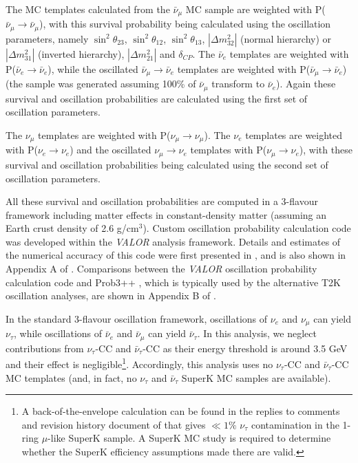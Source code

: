 The MC templates calculated from the $\bar{\nu}_{\mu}$ MC sample are weighted 
with P($\bar{\nu}_{\mu} \rightarrow \bar{\nu}_{\mu}$), with this survival probability being calculated using the 
oscillation parameters, namely $\sin^{2} \theta_{23}$, $\sin^{2} \theta_{12}$, $\sin^{2} \theta_{13}$, 
$|\Delta m^{2}_{32}|$ (normal hierarchy) or $|\Delta m^{2}_{31}|$ (inverted hierarchy), 
$|\Delta m^{2}_{21}|$ and $\delta_{CP}$. The $\bar{\nu}_{e}$ templates are weighted with P($\bar{\nu}_{e} \rightarrow \bar{\nu}_{e}$), 
while the oscillated $\bar{\nu}_{\mu} \rightarrow \bar{\nu}_{e}$ templates are weighted with P($\bar{\nu}_{\mu} \rightarrow \bar{\nu}_{e}$) 
(the sample was generated assuming 100\% of $\bar{\nu}_{\mu}$ transform to $\bar{\nu}_{e}$). Again these survival and oscillation probabilities 
are calculated using the first set of oscillation parameters. 

The $\nu_{\mu}$ templates are weighted with P($\nu_{\mu}\rightarrow\nu_{\mu}$). 
The $\nu_{e}$ templates are weighted with P($\nu_{e}\rightarrow\nu_{e}$) and the 
oscillated $\nu_{\mu} \rightarrow \nu_{e}$ templates with P($\nu_{\mu}\rightarrow\nu_{e}$), with these survival and oscillation 
probabilities being calculated using the second set of oscillation parameters.

All these survival and oscillation probabilities are computed in a 3-flavour framework including matter effects in constant-density matter
(assuming an Earth crust density of 2.6 g/cm$^{3}$).
Custom oscillation probability calculation code was developed within the {\em VALOR} analysis framework.
Details and estimates of the numerical accuracy of this code were first presented in \cite{OurRun12DisappAnalysis3Flavour},
and is also shown in Appendix A of \cite{OurRun123DisappAnalysis3Flavour}.
Comparisons between the {\em VALOR} oscillation probability calculation code and Prob3++ \cite{Prob3}, 
which is typically used by the alternative T2K oscillation analyses, are shown in Appendix B of \cite{OurRun123DisappAnalysis3Flavour}.

In the standard 3-flavour oscillation framework,
oscillations of $\nu_{e}$ and $\nu_{\mu}$ can yield $\nu_{\tau}$, while
oscillations of $\bar{\nu}_{e}$ and $\bar{\nu}_{\mu}$ can yield $\bar{\nu}_{\tau}$.
In this analysis, we neglect contributions from $\nu_{\tau}$-CC and $\bar{\nu}_{\tau}$-CC as their
energy threshold is around 3.5 GeV and their effect is negligible\footnote{
A back-of-the-envelope calculation can be found in the replies to
comments and revision history document of
\cite{OurRun123DisappAnalysis3Flavour} that gives $\ll 1\%$ $\nu_\tau$
contamination in the 1-ring $\mu$-like SuperK sample. A SuperK MC study is required
to determine whether the SuperK efficiency assumptions made there are valid.
  }.
Accordingly, this analysis uses no $\nu_{\tau}$-CC and $\bar{\nu}_{\tau}$-CC MC templates
(and, in fact, no $\nu_{\tau}$ and $\bar{\nu}_{\tau}$ SuperK MC samples are available).

